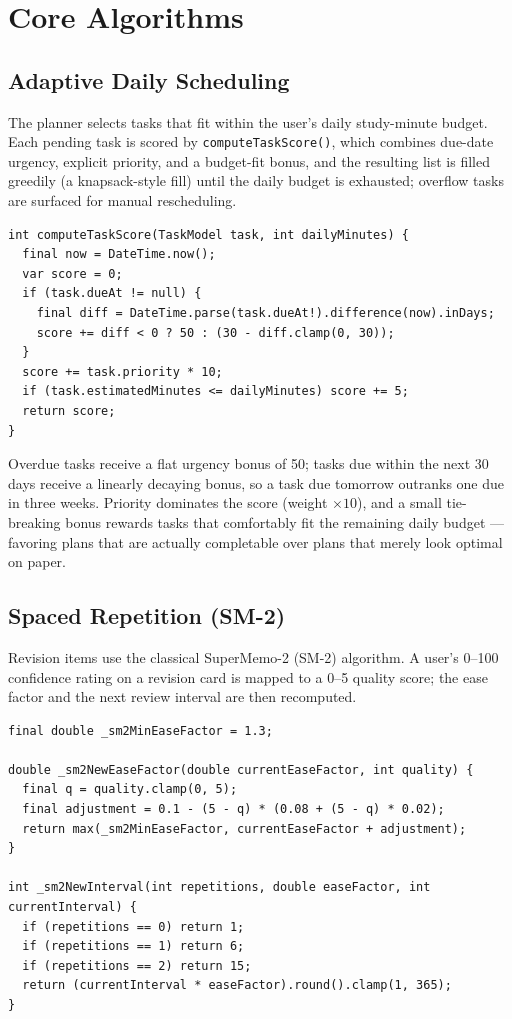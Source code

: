 \documentclass[11pt,a4paper]{article}
\begin{document}
\section{Core Algorithms}

\subsection{Adaptive Daily Scheduling}
The planner selects tasks that fit within the user's daily study-minute budget. Each pending task is scored by \texttt{computeTaskScore()}, which combines due-date urgency, explicit priority, and a budget-fit bonus, and the resulting list is filled greedily (a knapsack-style fill) until the daily budget is exhausted; overflow tasks are surfaced for manual rescheduling.

\begin{lstlisting}[caption={Task urgency scoring --- \texttt{lib/data/repositories/database\_repository.dart}}, label={lst:score}]
int computeTaskScore(TaskModel task, int dailyMinutes) {
  final now = DateTime.now();
  var score = 0;
  if (task.dueAt != null) {
    final diff = DateTime.parse(task.dueAt!).difference(now).inDays;
    score += diff < 0 ? 50 : (30 - diff.clamp(0, 30));
  }
  score += task.priority * 10;
  if (task.estimatedMinutes <= dailyMinutes) score += 5;
  return score;
}
\end{lstlisting}

Overdue tasks receive a flat urgency bonus of 50; tasks due within the next 30 days receive a linearly decaying bonus, so a task due tomorrow outranks one due in three weeks. Priority dominates the score (weight $\times 10$), and a small tie-breaking bonus rewards tasks that comfortably fit the remaining daily budget --- favoring plans that are actually completable over plans that merely look optimal on paper.

\subsection{Spaced Repetition (SM-2)}
Revision items use the classical SuperMemo-2 (SM-2) algorithm. A user's 0--100 confidence rating on a revision card is mapped to a 0--5 quality score; the ease factor and the next review interval are then recomputed.

\begin{lstlisting}[caption={SM-2 ease-factor and interval update --- \texttt{database\_repository.dart}}, label={lst:sm2}]
final double _sm2MinEaseFactor = 1.3;

double _sm2NewEaseFactor(double currentEaseFactor, int quality) {
  final q = quality.clamp(0, 5);
  final adjustment = 0.1 - (5 - q) * (0.08 + (5 - q) * 0.02);
  return max(_sm2MinEaseFactor, currentEaseFactor + adjustment);
}

int _sm2NewInterval(int repetitions, double easeFactor, int currentInterval) {
  if (repetitions == 0) return 1;
  if (repetitions == 1) return 6;
  if (repetitions == 2) return 15;
  return (currentInterval * easeFactor).round().clamp(1, 365);
}
\end{lstlisting}
\end{document}
